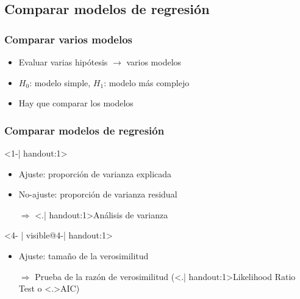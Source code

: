 \documentclass[mathserif]{beamer}
\begin{document}
 
\subsection[Comparaci\'on de modelos]{Comparar modelos de regresi\'on}

\begin{frame}[label=modelcompar]
   \frametitle{Comparar varios modelos}
    \begin{itemize}
      \item Evaluar varias hip\'otesis $\rightarrow$ varios modelos
      \item $H_0$: modelo simple, $H_1$: modelo m\'as complejo
      \item Hay que comparar los modelos
   \end{itemize}
\end{frame}%


\begin{frame}[label=compregrmod1]
   \frametitle{Comparar modelos de regresi\'on}
   \begin{block}{}<1-| handout:1>
      \begin{itemize}[<+-| handout:1>]
         \item Ajuste: proporci\'on de varianza explicada
         \item No-ajuste: proporci\'on de varianza residual
         \item[$\Rightarrow$] \alert<.| handout:1>{An\'alisis de varianza}
      \end{itemize}
   \end{block}
   \begin{block}{}<4- | visible@4-| handout:1>
      \begin{itemize}[<+-| handout:1>]
         \item Ajuste: tama\~no de la verosimilitud
         \item[$\Rightarrow$] Prueba de la raz\'on de verosimilitud (\alert<.| handout:1>{Likelihood Ratio Test} o \alert<.>{AIC})
      \end{itemize}
   \end{block}
\end{frame}%
\end{document}
